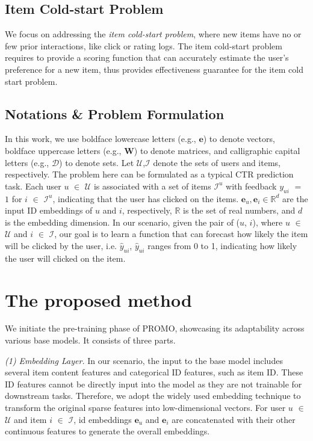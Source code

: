 \documentclass[sigconf]{acmart}
\newcommand{\sys}{\textsc{PROMO}\xspace}
\begin{document}
\subsection{Item Cold-start Problem}
We focus on addressing the \emph{item cold-start problem}, where new items have no or few prior interactions, like click or rating logs.
The item cold-start problem requires to provide a scoring function that can accurately estimate the user's preference for a new item, thus provides effectiveness guarantee for the item cold start problem. 

\subsection{Notations \& Problem Formulation}
In this work, we use boldface lowercase letters (e.g., $\bm{e}$) to denote vectors, boldface uppercase letters (e.g., $\bm{W}$) to denote
matrices, and calligraphic capital letters (e.g., $\mathcal{D}$) to denote sets. 
Let $\mathcal{U}$,$\mathcal{I}$ denote the sets of users and items, respectively.
The problem here can be formulated as a typical CTR prediction task. 
Each user $u$ $\in$ $\mathcal{U}$ is associated with a set of items $\mathcal{I}^u$ with feedback $y_{ui}$ $=$ $1$ for $i$ $\in$ $\mathcal{I}^u$, indicating that the user has clicked on the items. 
$\mathbf{e}_u, \mathbf{e}_i \in \mathbb{R}^d$ are the input ID embeddings of $u$ and $i$, respectively, $\mathbb{R}$ is the set of real numbers, and $d$ is the embedding dimension. 
In our scenario, given the pair of ($u$, $i$), where $u$ $\in$ $\mathcal{U}$ and $i$ $\in$ $\mathcal{I}$, our goal is to learn a function that can forecast how likely the item will be clicked by the user, i.e. $\hat{y}_{ui}$, $\hat{y}_{ui}$ ranges from 0 to 1, indicating how likely the user will clicked on the item. 

\section{The proposed method}
We initiate the pre-training phase of \sys, showcasing its adaptability across various base models. 
It consists of three parts.

\textit{(1) Embedding Layer.} In our scenario, the input to the base model includes several item content features and categorical ID features, such as item ID. 
These ID features cannot be directly input into the model as they are not trainable for downstream tasks. 
Therefore, we adopt the widely used embedding technique to transform the original sparse features into low-dimensional vectors. 
For user $u$ $\in$ $\mathcal{U}$ and item $i$ $\in$ $\mathcal{I}$, id embeddings $\mathbf{e}_u$ and $\mathbf{e}_i$ are concatenated with their other continuous features to generate the overall embeddings.
\end{document}
